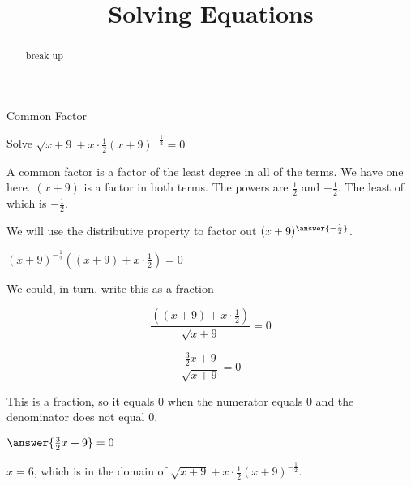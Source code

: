 \documentclass{ximera}
\title{Solving Equations}
\begin{document}
\begin{abstract}
break up
\end{abstract}
\maketitle





\begin{example}  Common Factor


Solve $\sqrt{x+9} + x \cdot \frac{1}{2} (x+9)^{-\tfrac{1}{2}} = 0$



\begin{explanation}



A common factor is a factor of the least degree in all of the terms.  We have one here. $(x+9)$ is a factor in both terms.  The powers are $\frac{1}{2}$ and $-\frac{1}{2}$. The least of which is $-\frac{1}{2}$.

We will use the distributive property to factor out $(x+9)^{\answer{-\frac{1}{2}}}$.


$(x+9)^{-\tfrac{1}{2}} \left((x+9) + x \cdot \frac{1}{2}\right)  = 0$


We could, in turn, write this as a fraction


\[  \frac{\left((x+9) + x \cdot \frac{1}{2}\right)}{\sqrt{x+9}} = 0 \]


\[  \frac{ \frac{3}{2} x + 9}{\sqrt{x+9}} = 0 \]



This is a fraction, so it equals $0$ when the numerator equals $0$ and the denominator does not equal $0$.


$\answer{\frac{3}{2} x + 9} = 0$



$x = 6$, which is in the domain of $\sqrt{x+9} + x \cdot \frac{1}{2} (x+9)^{-\tfrac{1}{2}}$.


\end{explanation}
\end{example}
\end{document}
